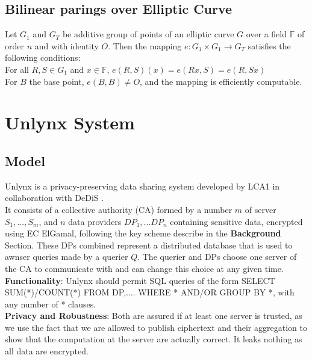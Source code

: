 \documentclass{article}
\begin{document}
\subsection*{Bilinear parings over Elliptic Curve}
Let $G_1$ and $G_T$ be additive group of points of an elliptic curve $G$ over a field $\mathbb{F}$ of order $n$ and with identity $O$. Then the mapping $e: G_1 \times G_1 \rightarrow G_T$ satisfies the following conditions:\\
For all $R,S \in G_1$ and $x \in \mathbb{F}$, $e(R,S)(x) = e(Rx,S) = e(R,Sx)$\\
For $B$ the base point, $e(B,B) \neq O$, and the mapping is efficiently computable.


\section{Unlynx System}
\subsection{Model}
Unlynx \cite{unlynx} is a privacy-preserving data sharing system developed by LCA1 \cite{lca} in collaboration with DeDiS \cite{dedis}.\\
It consists of a collective authority (CA) formed by a number $m$ of server $S_1,...,S_m$, and $n$ data providers $DP_1,...DP_n$ containing sensitive data, encrypted using EC ElGamal, following the key scheme describe in the \textbf{Background} Section. These DPs combined represent a distributed database that is used to awnser queries made by a querier $Q$. The querier and DPs choose one server of the CA to communicate with and can change this choice at any given time.\\
\textbf{Functionality}: Unlynx should permit SQL queries of the form SELECT SUM(*)/COUNT(*) FROM DP,.... WHERE * AND/OR GROUP BY *, with any number of * clauses.\\
\textbf{Privacy and Robustness}: Both are assured if at least one server is trusted, as we use the fact that we are allowed to publish ciphertext and their aggregation to show that the computation at the server are actually correct. It leaks nothing as all data are encrypted.
\end{document}
